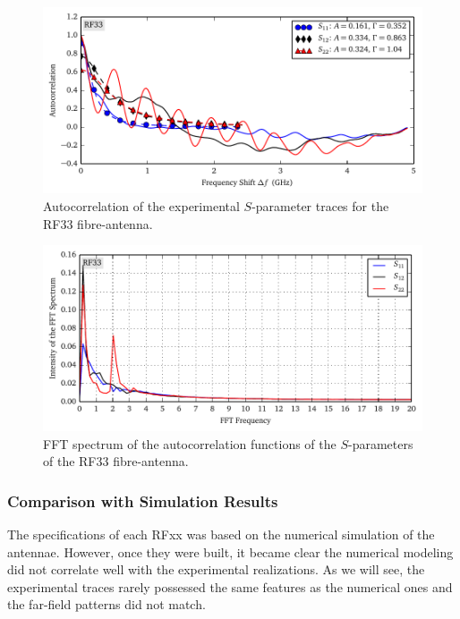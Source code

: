 \begin{figure}
 \centering
 \includegraphics{figs/active/RF33-autoCorrelation.pdf}
 \caption[Autocorrelation of the experimental $S$-parameter traces for the RF33 fibre-antenna]
 		{Autocorrelation of the experimental $S$-parameter traces for the RF33 fibre-antenna.}
 \label{fig:active.lcx.rf33autocorrelation}
\end{figure}

\begin{figure}
 \centering
 \includegraphics{figs/active/RF33-fft.pdf}
 \caption[FFT spectrum of the autocorrelation functions of the $S$-parameters of the RF33 fibre-antenna]
 		{FFT spectrum of the autocorrelation functions of the $S$-parameters of the RF33 fibre-antenna.}
 \label{fig:active.lcx.rf33fft}
\end{figure}


\subsubsection{Comparison with Simulation Results}
The specifications of each RFxx was based on the numerical simulation
of the antennae. However, once they were built, it became clear the 
numerical modeling did not correlate well with the experimental
realizations. As we will see, the experimental traces rarely possessed
the same features as the numerical ones and the far-field patterns 
did not match. 

